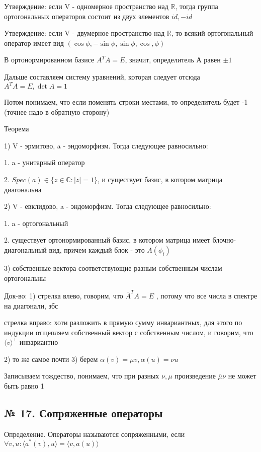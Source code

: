 \documentclass{article}
\begin{document}
Утверждение: если V - одномерное пространство над $\mathbb{R}$, тогда группа ортогональных операторов состоит из двух элементов $id, -id$

Утверждение: если V - двумерное пространство над $\mathbb{R}$, то всякий ортогональный оператор имеет вид $(\cos \phi, -\sin \phi, \sin \phi, \cos, \phi)$

В ортонормированном базисе $A^TA = E$, значит, определитель А равен $\pm 1$

Дальше составляем систему уравнений, которая следует отсюда $A^TA = E, \det A = 1$

Потом понимаем, что если поменять строки местами, то определитель будет -1 (точнее надо в обратную сторону)

Теорема

1) V - эрмитово, a - эндоморфизм. Тогда следующее равносильно:

1. a - унитарный оператор

2. $Spec(a) \in \{z \in \mathbb{C} : |z| = 1\}$, и существует базис, в котором матрица диагональна

2) V - евклидово, a - эндоморфизм. Тогда следующее равносильно:

1. a - ортогональный

2. существует ортонормированный базис, в котором матрица имеет блочно-диагональный вид, причем каждый блок - это $A(\phi_i)$

3) собственные вектора соответствующие разным собственным числам ортогональны

Док-во:
1) стрелка влево, говорим, что $\overline{A}^TA = E$
, потому что все числа в спектре на диагонали, збс

стрелка вправо: хоти разложить в прямую сумму инвариантных, для этого по индукции отщепляем собственный вектор с собственным числом, и говорим, что $\langle v \rangle ^\perp$ инвариантно
 
2) то же самое почти
3) берем $\alpha(v) = \mu v, \alpha(u) = \nu u$

Записываем тождество, понимаем, что при разных $\nu, \mu$ произведение $\overline{\mu}\nu$ не может быть равно 1

\subsection{\tiny № 17. Сопряженные операторы}

Определение. Операторы называются сопряженными, если $\forall v, u : \langle a^*(v), u \rangle = \langle v, a(u) \rangle $
\end{document}
